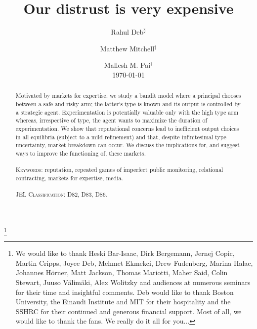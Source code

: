 \documentclass[11pt,reqno]{amsart}
\begin{document}
\title[Our distrust is very expensive]{Our distrust is very expensive}

\author[Deb]{Rahul Deb$^{\between}$}
\address{$^{\between}$Department of Economics, University of Toronto\\\href{mailto:rahul.deb@utoronto.ca}{rahul.deb@utoronto.ca}}
\author[Mitchell]{Matthew Mitchell$^{\dagger}$}
\address{$^{\dagger}$Graduate Department of Management, University of Toronto\\\href{mailto:matthew.mitchell@rotman.utoronto.ca}{matthew.mitchell@rotman.utoronto.ca}}
\author[Pai]{Mallesh M. Pai$^{\ddag}$\\\today}
\address{$^{\ddag}$Department of Economics, Rice University\\\href{mailto:mallesh.pai@rice.edu}{mallesh.pai@rice.edu}}


\thanks{We would like to thank Heski Bar-Isaac, Dirk Bergemann, Jernej Copic, Martin Cripps, Joyee Deb, Mehmet Ekmekci, Drew Fudenberg, Marina Halac, Johannes H\"orner, Matt Jackson, Thomas Mariotti, Maher Said, Colin Stewart, Juuso V\"alim\"aki, Alex Wolitzky and audiences at numerous seminars for their time and insightful comments. Deb would like to thank Boston University, the Einaudi Institute and MIT for their hospitality and the SSHRC for their continued and generous financial support. Most of all, we would like to thank the fans. We really do it all for you...}

\begin{abstract}
Motivated by markets for expertise, we study a bandit model where a principal chooses between a safe and risky arm; the latter's type is known and its output is controlled by a strategic agent. Experimentation is potentially valuable only with the high type arm whereas, irrespective of type, the agent wants to maximize the duration of experimentation. We show that reputational concerns lead to inefficient output choices in all equilibria (subject to a mild refinement) and that, despite infinitesimal type uncertainty, market breakdown can occur. We discuss the implications for, and suggest ways to improve the functioning of, these markets.
\\
\\
\noindent
\textsc{Keywords:} reputation, repeated games of imperfect public monitoring, relational contracting, markets for expertise, media.
\\
\\
\noindent
\textsc{JEL Classification:}
D82, %
D83, %
D86. %
\end{abstract}
\end{document}
